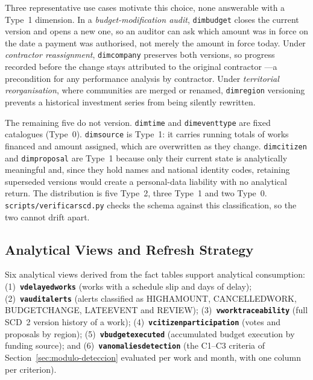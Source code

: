 \documentclass[runningheads]{llncs}
\renewcommand{\_}{\origunderscore\allowbreak}
\begin{document}
\begingroup
Three representative use cases motivate this choice, none answerable with a Type~1 dimension. In a \emph{budget-modification audit}, \texttt{dim\_budget} closes the current version and opens a new one, so an auditor can ask which amount was in force on the date a payment was authorised, not merely the amount in force today. Under \emph{contractor reassignment}, \texttt{dim\_company} preserves both versions, so progress recorded before the change stays attributed to the original contractor ---a precondition for any performance analysis by contractor. Under \emph{territorial reorganisation}, where communities are merged or renamed, \texttt{dim\_region} versioning prevents a historical investment series from being silently rewritten.

The remaining five do not version. \texttt{dim\_time} and \texttt{dim\_event\_type} are fixed catalogues (Type~0). \texttt{dim\_source} is Type~1: it carries running totals of works financed and amount assigned, which are overwritten as they change. \texttt{dim\_citizen} and \texttt{dim\_proposal} are Type~1 because only their current state is analytically meaningful and, since they hold names and national identity codes, retaining superseded versions would create a personal-data liability with no analytical return. The distribution is five Type~2, three Type~1 and two Type~0. \texttt{scripts/verificar\_scd.py} checks the schema against this classification, so the two cannot drift apart.
\endgroup

\subsection{Analytical Views and Refresh Strategy}
\label{sec:vistas}

Six analytical views derived from the fact tables support analytical consumption: (1)~\textbf{\texttt{v\_delayed\_works}} (works with a schedule slip and days of delay); (2)~\textbf{\texttt{v\_audit\_alerts}} (alerts classified as HIGH\_AMOUNT, CANCELLED\_WORK, BUDGET\_CHANGE, LATE\_EVENT and REVIEW); (3)~\textbf{\texttt{v\_work\_traceability}} (full SCD~2 version history of a work); (4)~\textbf{\texttt{v\_citizen\_participation}} (votes and proposals by region); (5)~\textbf{\texttt{v\_budget\_executed}} (accumulated budget execution by funding source); and (6)~\textbf{\texttt{v\_anomalies\_detection}} (the C1--C3 criteria of Section~\ref{sec:modulo-deteccion} evaluated per work and month, with one column per criterion).
\end{document}
